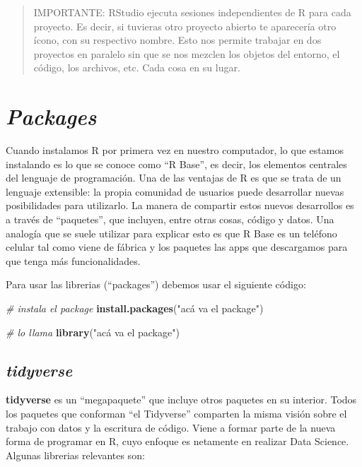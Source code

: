 \documentclass[12pt,]{book}
\newenvironment{Shaded}{\begin{snugshade}}{\end{snugshade}}
\newcommand{\KeywordTok}[1]{\textcolor[rgb]{0.13,0.29,0.53}{\textbf{#1}}}
\newcommand{\StringTok}[1]{\textcolor[rgb]{0.31,0.60,0.02}{#1}}
\newcommand{\CommentTok}[1]{\textcolor[rgb]{0.56,0.35,0.01}{\textit{#1}}}
\newcommand{\NormalTok}[1]{#1}
\begin{document}
\begin{quote}
IMPORTANTE: RStudio ejecuta sesiones independientes de R para cada
proyecto. Es decir, si tuvieras otro proyecto abierto te aparecería otro
ícono, con su respectivo nombre. Esto nos permite trabajar en dos
proyectos en paralelo sin que se nos mezclen los objetos del entorno, el
código, los archivos, etc. Cada cosa en su lugar.
\end{quote}

\section{\texorpdfstring{\emph{Packages}}{Packages}}\label{packages}

Cuando instalamos R por primera vez en nuestro computador, lo que
estamos instalando es lo que se conoce como ``R Base'', es decir, los
elementos centrales del lenguaje de programación. Una de las ventajas de
R es que se trata de un lenguaje extensible: la propia comunidad de
usuarios puede desarrollar nuevas posibilidades para utilizarlo. La
manera de compartir estos nuevos desarrollos es a través de
``paquetes'', que incluyen, entre otras cosas, código y datos. Una
analogía que se suele utilizar para explicar esto es que R Base es un
teléfono celular tal como viene de fábrica y los paquetes las apps que
descargamos para que tenga más funcionalidades.

Para usar las librerias (``packages'') debemos usar el siguiente código:

\begin{Shaded}
\begin{Highlighting}[]
\CommentTok{# instala el package}
\KeywordTok{install.packages}\NormalTok{(}\StringTok{"acá va el package"}\NormalTok{)}

\CommentTok{# lo llama}
\KeywordTok{library}\NormalTok{(}\StringTok{"acá va el package"}\NormalTok{)}
\end{Highlighting}
\end{Shaded}

\subsection{\texorpdfstring{\emph{tidyverse}}{tidyverse}}\label{tidyverse}

\textbf{tidyverse} es un ``megapaquete'' que incluye otros paquetes en
su interior. Todos los paquetes que conforman ``el Tidyverse'' comparten
la misma visión sobre el trabajo con datos y la escritura de código.
Viene a formar parte de la nueva forma de programar en R, cuyo enfoque
es netamente en realizar Data Science. Algunas librerias relevantes son:
\end{document}
